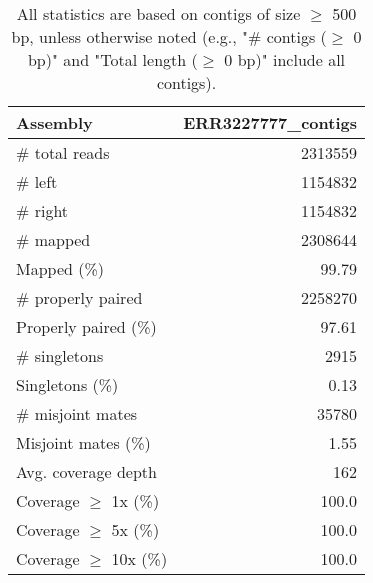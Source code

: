 \documentclass[12pt,a4paper]{article}
\begin{document}
\begin{table}[ht]
\begin{center}
\caption{All statistics are based on contigs of size $\geq$ 500 bp, unless otherwise noted (e.g., "\# contigs ($\geq$ 0 bp)" and "Total length ($\geq$ 0 bp)" include all contigs).}
\begin{tabular}{|l*{1}{|r}|}
\hline
Assembly & ERR3227777\_contigs \\ \hline
\# total reads & 2313559 \\ \hline
\# left & 1154832 \\ \hline
\# right & 1154832 \\ \hline
\# mapped & 2308644 \\ \hline
Mapped (\%) & 99.79 \\ \hline
\# properly paired & 2258270 \\ \hline
Properly paired (\%) & 97.61 \\ \hline
\# singletons & 2915 \\ \hline
Singletons (\%) & 0.13 \\ \hline
\# misjoint mates & 35780 \\ \hline
Misjoint mates (\%) & 1.55 \\ \hline
Avg. coverage depth & 162 \\ \hline
Coverage $\geq$ 1x (\%) & 100.0 \\ \hline
Coverage $\geq$ 5x (\%) & 100.0 \\ \hline
Coverage $\geq$ 10x (\%) & 100.0 \\ \hline
\end{tabular}
\end{center}
\end{table}
\end{document}
